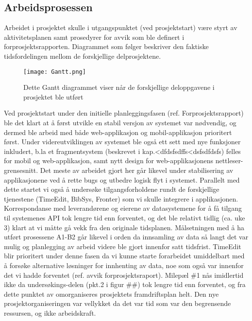 \documentclass[../main.tex]{subfiles}
\begin{document}
\subsection{Arbeidsprosessen}
Arbeidet i prosjektet skulle i utgangspunktet (ved prosjektstart) være styrt av aktivitetsplanen samt prosedyrer for avvik som ble definert i forprosjektsrapporten. Diagrammet som følger beskriver den faktiske tidsfordelingen mellom de forskjellige delprosjektene.
\begin{figure}[H]
  \centering
  \texttt{[image: Gantt.png]}
  \caption{Dette Gantt diagrammet viser når de forskjellige deloppgavene i prosjektet ble utført}
\end{figure}
Ved prosjektstart under den initielle planleggingsfasen (ref. Forprosjektsrapport) ble det klart at å først utvikle en stabil versjon av systemet var nødvendig, og dermed ble arbeid med både web-applikasjon og mobil-applikasjon prioritert først. Under videreutviklingen av systemet ble også ett sett med nye funksjoner inkludert, b.la et fragmentsystem (beskrevet i kap.<dfdsfsdffs<dsfsdfdsfs) felles for mobil og web-applikasjon, samt nytt design for web-applikasjonens nettleser-grensesnitt. Det meste av arbeidet gjort her går likevel under stabilisering av applikasjonene ved å rette bugs og utbedre logisk flyt i systemet. \newline
Parallelt med dette startet vi også å undersøke tilgangsforholdene rundt de forskjellige tjenestene (TimeEdit, BibSys, Fronter) som vi skulle integrere i applikasjonen. Korrespondanse med leverandørene og eierene av datasystemene for å få tilgang til systemenes API tok lengre tid enn forventet, og det ble relativt tidlig (ca. uke 3) klart at vi måtte gå vekk fra den originale tidsplanen.\newline
Målsetningen med å ha utført prosessene A1-B2 går likevel i orden da innsamling av data så langt det var mulig og planlegging av arbeid videre ble gjort innenfor satt tidsfrist. TimeEdit blir prioritert under denne fasen da vi kunne starte forarbeidet umiddelbart med å forsøke alternative løsninger for innhenting av data, noe som også var innenfor det vi hadde forventet (ref. avvik forprosjektsraport). Milepæl \#1 nås imidlertid ikke da undersøkings-delen (pkt.2 i figur \#\#) tok lengre tid enn forventet, og fra dette punktet av omorganiseres prosjektets framdriftsplan helt.\newline
Den nye prosjektorganiseringen var vellykket da det var tid som var den begrensende ressursen, og ikke arbeidskraft.

\newpage
\end{document}
